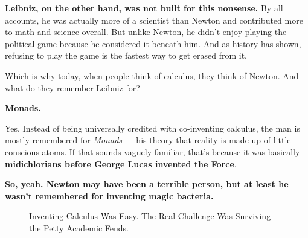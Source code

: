 \textbf{Leibniz, on the other hand, was not built for this nonsense.} By all accounts, he was actually more of a scientist than Newton and contributed more to math and science overall. But unlike Newton, he didn’t enjoy playing the political game because he considered it beneath him. And as history has shown, refusing to play the game is the fastest way to get erased from it. 

Which is why today, when people think of calculus, they think of Newton. And what do they remember Leibniz for? 

\textbf{Monads.}  

Yes. Instead of being universally credited with co-inventing calculus, the man is mostly remembered for \textit{Monads} --- his theory that reality is made up of little conscious atoms. If that sounds vaguely familiar, that’s because it was basically \textbf{midichlorians before George Lucas invented the Force}. 

\textbf{So, yeah. Newton may have been a terrible person, but at least he wasn’t remembered for inventing magic bacteria.}





\begin{figure}[H]
\centering
{}
\caption{Inventing Calculus Was Easy. The Real Challenge Was Surviving the Petty Academic Feuds.}
\end{figure}